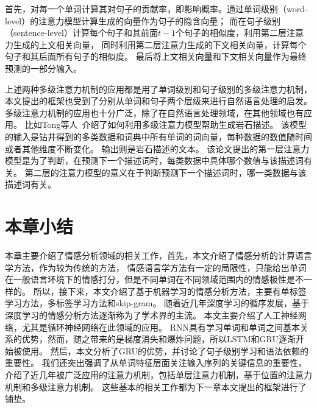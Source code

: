 首先，对每一个单词计算其对句子的贡献率，即影响概率。通过单词级别（word-level）的注意力模型计算生成的向量作为句子的隐含向量；
而在句子级别（sentence-level）计算每个句子和其前面${t-1}$个句子的相似度，利用第二层注意力生成的上文相关向量，
同时利用第二层注意力生成的下文相关向量，计算每个句子和其后面所有句子的相似度。
最后将上文相关向量和下文相关向量作为最终预测的一部分输入。

上述两种多级注意力机制的应用都是用了单词级别和句子级别的多级注意力机制，本文提出的框架也受到了分别从单词和句子两个层级来进行自然语言处理的启发。
多级注意力机制的应用也十分广泛，除了在自然语言处理领域，在其他领域也有应用。
比如Tong等人~介绍了如何利用多级注意力模型帮助生成岩石描述。
该模型的输入是钻井得到的多类数据和词典中所有单词的词向量，每种数据的数值随时间或者其他维度不断变化。
输出则是岩石描述的文本。
该论文提出的第一层注意力模型是为了判断，在预测下一个描述词时，每类数据中具体哪个数值与该描述词有关。
第二层的注意力模型的意义在于判断预测下一个描述词时，哪一类数据与该描述词有关。

\section{本章小结}
本章主要介绍了情感分析领域的相关工作，首先，本文介绍了情感分析的计算语言学方法，作为较为传统的方法，
情感语言学方法有一定的局限性，只能给出单词在一般语言环境下的情感打分，但是不同单词在不同领域范围内的情感极性是不一样的。
所以，接下来，本文介绍了基于机器学习的情感分析方法，主要有单标签学习方法，多标签学习方法和skip-gram。
随着近几年深度学习的循序发展，基于深度学习的情感分析方法逐渐称为了学术界的主流。
本文主要介绍了人工神经网络，尤其是循环神经网络在此领域的应用。
RNN具有学习单词和单词之间基本关系的优势，然而，随之带来的是梯度消失和爆炸问题，所以LSTM和GRU逐渐开始被使用。
然后，本文分析了GRU的优势，并讨论了句子级别学习和语法依赖的重要性。
我们还突出强调了从单词特征层面关注输入序列的关键信息的重要性，介绍了近几年被广泛应用的注意力机制，包括单层注意力机制，基于位置的注意力机制和多级注意力机制。
这些基本的相关工作都为下一章本文提出的框架进行了铺垫。









